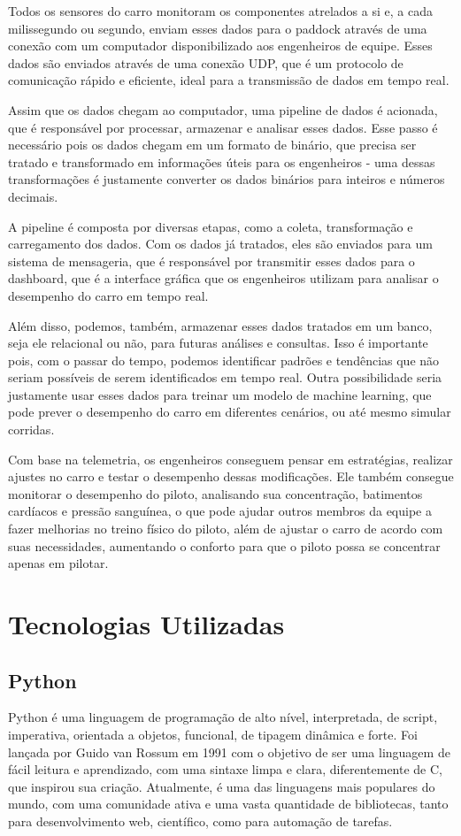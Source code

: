 \documentclass[12pt, %
openright, 
oneside, %
a4paper,    %
brazil]{facom-ufu-abntex2}
\begin{document}
Todos os sensores do carro monitoram os componentes atrelados a si e, a cada milissegundo ou segundo, enviam esses dados para o paddock através de uma conexão
com um computador disponibilizado aos engenheiros de equipe. Esses dados são enviados através de uma conexão UDP, que é um protocolo de comunicação rápido e 
eficiente, ideal para a transmissão de dados em tempo real.

Assim que os dados chegam ao computador, uma pipeline de dados é acionada, que é responsável por processar, armazenar e analisar esses dados. Esse passo é necessário
pois os dados chegam em um formato de binário, que precisa ser tratado e transformado em informações úteis para os engenheiros - uma dessas
transformações é justamente converter os dados binários para inteiros e números decimais. 

A pipeline é composta por diversas etapas, como a coleta, transformação e carregamento dos dados. Com os dados já tratados, eles são enviados para um sistema de mensageria,
que é responsável por transmitir esses dados para o dashboard, que é a interface gráfica que os engenheiros utilizam para analisar o desempenho do carro em tempo real.

Além disso, podemos, também, armazenar esses dados tratados em um banco, seja ele relacional ou não, para futuras análises e consultas. Isso é importante pois,
com o passar do tempo, podemos identificar padrões e tendências que não seriam possíveis de serem identificados em tempo real. Outra possibilidade seria justamente
usar esses dados para treinar um modelo de machine learning, que pode prever o desempenho do carro em diferentes cenários, ou até mesmo simular corridas.

Com base na telemetria, os engenheiros conseguem pensar em estratégias, realizar ajustes no carro e testar o desempenho dessas modificações.
Ele também consegue monitorar o desempenho do piloto, analisando sua concentração, batimentos cardíacos e pressão sanguínea, o que pode
ajudar outros membros da equipe a fazer melhorias no treino físico do piloto, além de ajustar o carro de acordo com suas necessidades, aumentando
o conforto para que o piloto possa se concentrar apenas em pilotar.

\section{Tecnologias Utilizadas}

\subsection{Python}
Python é uma linguagem de programação de alto nível, interpretada, de script, imperativa, orientada a objetos, funcional, de tipagem dinâmica e forte.
Foi lançada por Guido van Rossum em 1991 com o objetivo de ser uma linguagem de fácil leitura e aprendizado, com uma sintaxe limpa e clara, diferentemente de C, que inspirou sua criação.
Atualmente, é uma das linguagens mais populares do mundo, com uma comunidade ativa e uma vasta quantidade de bibliotecas, tanto para desenvolvimento web, científico, como para automação de tarefas.
\end{document}
